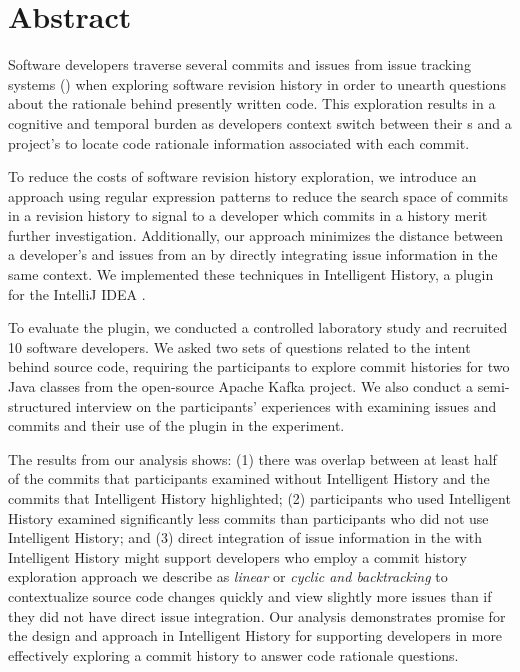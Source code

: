 
\chapter{Abstract}


Software developers traverse several commits and issues from issue tracking systems ()
when exploring software revision history in order to unearth questions about the rationale behind presently written code.
This exploration results in a cognitive and temporal burden as developers
context switch between their s and a project's  to locate code rationale information
associated with each commit.

To reduce the costs of software revision history exploration,
we introduce an approach using regular expression patterns to reduce the search space of commits in a revision history to signal to a developer which commits in a history merit further investigation.
Additionally, our approach minimizes the distance between a developer's  and issues from an 
by directly integrating issue information in the same context.
We implemented these techniques in Intelligent History, a plugin for the IntelliJ IDEA .

To evaluate the plugin, we conducted a controlled laboratory study and recruited 10 software developers.
We asked two sets of questions related to the intent behind source code, requiring the participants to explore 
commit histories for two Java classes from the open-source Apache Kafka project.
We also conduct a semi-structured interview on the participants' experiences with examining issues and commits 
and their use of the plugin in the experiment.

The results from our analysis shows:
(1) there was overlap between at least half of the commits
that participants examined without Intelligent History and the commits that Intelligent History
highlighted; (2) participants who used Intelligent History examined significantly
less commits than participants who did not use Intelligent History;
and (3) direct integration of issue information in the 
with Intelligent History might support developers who employ a commit history exploration approach
we describe as \textit{linear} or \textit{cyclic and backtracking} to contextualize
source code changes quickly and view slightly more issues than if they did not have
direct issue integration.
Our analysis demonstrates promise for the design and approach in Intelligent History
for supporting developers in more effectively exploring a commit history to answer code rationale questions.


